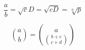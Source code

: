 \[ \frac{a}{b} = \sqrt cD = \sqrt{cD}
  = \sqrt[n] p \]

\[ {a \choose b} 
   = {a \choose {b +c \choose c +d}} \]
